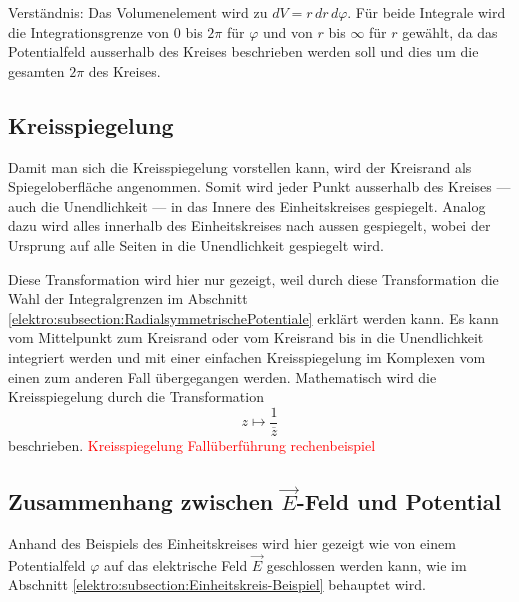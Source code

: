 Verständnis: 
Das Volumenelement wird zu $dV = r \, dr \, d\varphi $.
Für beide Integrale wird die Integrationsgrenze von $0$ bis $2\pi$ für $\varphi$ und von $r$ bis $\infty$ für $r$ gewählt, da das Potentialfeld ausserhalb des Kreises beschrieben werden soll und dies um die gesamten $2\pi$ des Kreises.


\subsection{Kreisspiegelung
\label{elektro:subsection:Kreisspiegelung}}

Damit man sich die Kreisspiegelung vorstellen kann, wird der Kreisrand als Spiegeloberfläche angenommen. 
Somit wird jeder Punkt ausserhalb des Kreises --- auch die Unendlichkeit --- in das Innere des Einheitskreises gespiegelt.
Analog dazu wird alles innerhalb des Einheitskreises nach aussen gespiegelt, wobei der Ursprung auf alle Seiten in die Unendlichkeit gespiegelt wird. 

Diese Transformation wird hier nur gezeigt, weil durch diese Transformation die Wahl der Integralgrenzen im Abschnitt \ref{elektro:subsection:RadialsymmetrischePotentiale} erklärt werden kann.
Es kann vom Mittelpunkt zum Kreisrand oder vom Kreisrand bis in die Unendlichkeit integriert werden und mit einer einfachen Kreisspiegelung im Komplexen vom einen zum anderen Fall übergegangen werden. 
Mathematisch wird die Kreisspiegelung durch die Transformation
\begin{equation}
    z \mapsto \frac{1}{\overline{z}}
\end{equation}
beschrieben.
\textcolor{red}{Kreisspiegelung Fallüberführung rechenbeispiel}


\subsection{Zusammenhang zwischen $\vec{E}$-Feld und Potential
\label{elektro:subsection:ephizusammenhang}}
Anhand des Beispiels des Einheitskreises wird hier gezeigt wie von einem Potentialfeld $\varphi$ auf das elektrische Feld $\vec{E}$ geschlossen werden kann, wie im Abschnitt \ref{elektro:subsection:Einheitskreis-Beispiel} behauptet wird.

